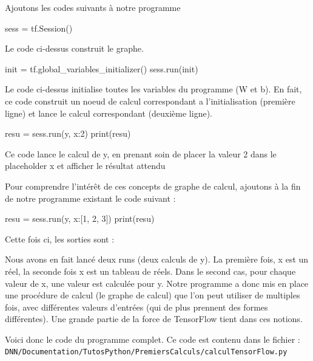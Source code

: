 \documentclass[a4paper,11pt]{book}
\begin{document}
Ajoutons les codes suivants à notre programme
\begin{mypython}
sess = tf.Session()
\end{mypython}
Le code ci-dessus construit le graphe.
\begin{mypython}
init = tf.global_variables_initializer()
sess.run(init)
\end{mypython}
Le code ci-dessus initialise toutes les variables du programme (W et b). En fait, ce code construit un noeud de calcul correspondant a l'initialisation (première ligne) et lance le calcul correspondant (deuxième ligne).

\begin{mypython} 
resu = sess.run(y, {x:2}) 
print(resu)
\end{mypython}
Ce code lance le calcul de y, en prenant soin de placer la valeur 2 dans le placeholder x et afficher le résultat attendu
\begin{myoutput}
[0.3]
\end{myoutput}
Pour comprendre l'intérêt de ces concepts de graphe de calcul, ajoutons à la fin de notre programme existant le code suivant :

\begin{mypython} 
resu = sess.run(y, {x:[1, 2, 3]}) 
print(resu)
\end{mypython} 

Cette fois ci, les sorties sont :

\begin{mypython} 
[0.3]
[0.  0.3 0.6]
\end{mypython} 

Nous avons en fait lancé deux runs (deux calculs de y). La première fois, x est un réel, la seconde fois x est un tableau de réels. Dans le second cas, pour chaque valeur de x, une valeur est calculée pour y.
Notre programme a donc mis en place une procédure de calcul (le graphe de calcul) que l'on peut utiliser de multiples fois, avec différentes valeurs d'entrées (qui de plus prennent des formes différentes).
Une grande partie de la force de TensorFlow tient dans ces notions.

Voici donc le code du programme complet. Ce code est contenu dans le fichier :\\
\verb+DNN/Documentation/TutosPython/PremiersCalculs/calculTensorFlow.py+


\end{document}
